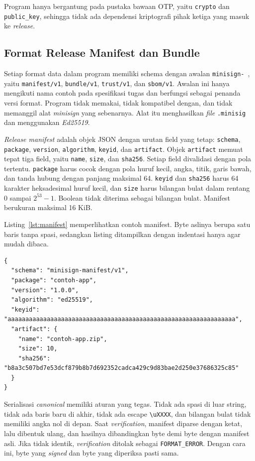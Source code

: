 Program hanya bergantung pada pustaka bawaan OTP, yaitu \texttt{crypto} dan \texttt{public\_key},
sehingga tidak ada dependensi kriptografi pihak ketiga yang masuk ke \textit{release}.

\subsection{Format Release Manifest dan Bundle}
Setiap format data dalam program memiliki schema dengan awalan \texttt{minisign-}~\cite{minisign}, yaitu
\texttt{manifest/v1}, \texttt{bundle/v1}, \texttt{trust/v1}, dan \texttt{sbom/v1}.
Awalan ini hanya mengikuti nama contoh pada spesifikasi tugas dan
berfungsi sebagai penanda versi format. Program tidak memakai, tidak kompatibel dengan, dan tidak memanggil
alat \textit{minisign} yang sebenarnya. Alat itu menghasilkan \textit{file} \texttt{.minisig}
dan menggunakan \textit{Ed25519}.

\textit{Release manifest} adalah objek JSON dengan urutan field yang tetap: \texttt{schema},
\texttt{package}, \texttt{version}, \texttt{algorithm}, \texttt{keyid}, dan \texttt{artifact}.
Objek \texttt{artifact} memuat tepat tiga field, yaitu \texttt{name}, \texttt{size}, dan
\texttt{sha256}. Setiap field divalidasi dengan pola tertentu. \texttt{package} harus cocok dengan
pola huruf kecil, angka, titik, garis bawah, dan tanda hubung dengan panjang maksimal 64.
\texttt{keyid} dan \texttt{sha256} harus 64 karakter heksadesimal huruf kecil, dan \texttt{size}
harus bilangan bulat dalam rentang 0 sampai $2^{53}-1$. Boolean tidak diterima sebagai bilangan
bulat. Manifest berukuran maksimal 16 KiB.

Listing~\ref{lst:manifest} memperlihatkan contoh manifest. Byte aslinya berupa satu baris tanpa
spasi, sedangkan listing ditampilkan dengan indentasi hanya agar mudah dibaca.

\begin{lstlisting}[basicstyle=\ttfamily\footnotesize,caption={Contoh \textit{release manifest} (ditampilkan dengan indentasi)},label={lst:manifest},numbers=none]
{
  "schema": "minisign-manifest/v1",
  "package": "contoh-app",
  "version": "1.0.0",
  "algorithm": "ed25519",
  "keyid": "aaaaaaaaaaaaaaaaaaaaaaaaaaaaaaaaaaaaaaaaaaaaaaaaaaaaaaaaaaaaaaaa",
  "artifact": {
    "name": "contoh-app.zip",
    "size": 10,
    "sha256": "b8a3c507bd7e53dcf879b8b7d692352cadca429c9d83bae2d250e37686325c85"
  }
}
\end{lstlisting}

Serialisasi \textit{canonical} memiliki aturan yang tegas. Tidak ada spasi di luar string, tidak
ada baris baru di akhir, tidak ada escape \texttt{\textbackslash uXXXX}, dan bilangan bulat tidak
memiliki angka nol di depan. Saat \textit{verification}, manifest diparse dengan ketat, lalu dibentuk ulang,
dan hasilnya dibandingkan byte demi byte dengan manifest asli. Jika tidak identik, \textit{verification}
ditolak sebagai \texttt{FORMAT\_ERROR}. Dengan cara ini, byte yang \textit{signed} dan byte yang
diperiksa pasti sama.


